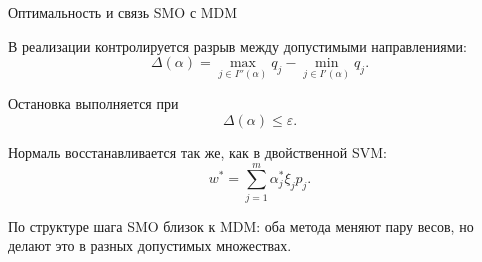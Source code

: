 \SPBGContentSlide
  {Оптимальность и связь SMO с MDM}
  {%
    \FormulaBody
    В реализации контролируется разрыв между допустимыми направлениями:
    \[
      \Delta(\alpha)=
      \max_{j\in I''(\alpha)}q_j-
      \min_{j\in I'(\alpha)}q_j.
    \]

    Остановка выполняется при
    \[
      \Delta(\alpha)\leq\varepsilon.
    \]

    Нормаль восстанавливается так же, как в двойственной SVM:
    \[
      w^*=\sum_{j=1}^{m}\alpha_j^*\xi_jp_j.
    \]

    \Body
    По структуре шага SMO близок к MDM: оба метода меняют пару весов,
    но делают это в разных допустимых множествах.
  }

